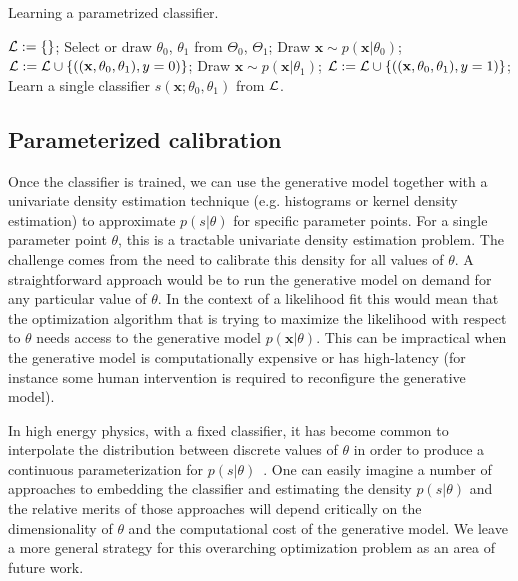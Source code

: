 \documentclass[12pt]{article}
\numberwithin{equation}{section}
\theoremstyle{plain}
\begin{document}
\begin{algorithm}[t]
\caption{Learning a parametrized classifier.}\label{alg:training}
\begin{algorithmic}
    \State ${\cal L := \{ \}}$;
        \State Select or draw $\theta_0$, $\theta_1$ from $\Theta_0$, $\Theta_1$;
	    \State Draw $\mathbf{x} \sim p(\mathbf{x}|\theta_0)$;
		\State ${\cal L} := {\cal L} \cup \{ ((\mathbf{x}, \theta_0, \theta_1), y=0) \}$;
		\State Draw $\mathbf{x} \sim p(\mathbf{x}|\theta_1)$;
		\State ${\cal L} := {\cal L} \cup \{ ((\mathbf{x}, \theta_0, \theta_1), y=1) \}$;
    \EndWhile
    \State Learn a single classifier $s(\mathbf{x}; \theta_0, \theta_1)$ from ${\cal L}$.
\end{algorithmic}
\end{algorithm}


\subsection{Parameterized calibration}
\label{sec:param-calibration}

Once the classifier is trained, we can use the generative model together with a
univariate density estimation technique (e.g. histograms or kernel density
estimation) to approximate $p(s|\theta)$ for specific parameter
points. For a single parameter point $\theta$, this is a tractable univariate density
estimation problem. The challenge comes from the need to calibrate this density
for all values of $\theta$. A straightforward approach would be to run the
generative model on demand for any particular value of $\theta$. In the context
of a likelihood fit this would mean that the optimization algorithm that is
trying to maximize the likelihood with respect to $\theta$ needs access to the
generative model $p(\mathbf{x}|\theta)$. This can be  impractical when the generative
model is computationally expensive or has high-latency (for instance some human
intervention is required to reconfigure the generative model).

In high energy physics, with a
fixed classifier, it has become common  to interpolate the distribution between
discrete values of $\theta$ in order to produce a continuous parameterization for
$p(s | \theta)$~\citep{Cranmer:2012sba}.
One can easily imagine a number of approaches to embedding the classifier and
estimating the density $p(s|\theta)$ and the relative merits of those
approaches will depend critically on the dimensionality of $\theta$ and the
computational cost of the generative model. We leave a more general strategy for
this overarching optimization problem as an area of future work.
\end{document}
